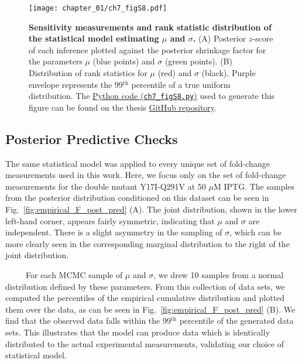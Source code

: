 \documentclass[12pt]{caltech_thesis}
\begin{document}
\hypertarget{fig:empirical_F_sensitivity}{%
\begin{figure}
\centering
\texttt{[image: chapter\_01/ch7\_figS8.pdf]}
\caption[{Sensitivity measurements and rank statistic distribution of
the statistical model estimating \(\mu\) and
\(\sigma\).}]{\textbf{Sensitivity measurements and rank statistic
distribution of the statistical model estimating \(\mu\) and
\(\sigma\).} (A) Posterior \(z\)-score of each inference plotted against
the posterior shrinkage factor for the parameters \(\mu\) (blue points)
and \(\sigma\) (green points). (B) Distribution of rank statistics for
\(\mu\) (red) and \(\sigma\) (black). Purple envelope represents the
99\(^\text{th}\) percentile of a true uniform distribution. The
\href{https://github.com/gchure/phd/blob/master/src/chapter_07/code/ch7_figS8.py}{Python
code (\texttt{ch7\_figS8.py})} used to generate this figure can be found
on the thesis \href{https://github.com/gchure/phd}{GitHub repository}.}
\label{fig:empirical_F_sensitivity}
\end{figure}
}

\hypertarget{posterior-predictive-checks}{%
\subsection{Posterior Predictive
Checks}\label{posterior-predictive-checks}}

The same statistical model was applied to every unique set of
fold-change measurements used in this work. Here, we focus only on the
set of fold-change measurements for the double mutant Y17I-Q291V at 50
\(\mu\)M IPTG. The samples from the posterior distribution conditioned
on this dataset can be seen in Fig.~\ref{fig:empirical_F_post_pred} (A).
The joint distribution, shown in the lower left-hand corner, appears
fairly symmetric, indicating that \(\mu\) and \(\sigma\) are
independent. There is a slight asymmetry in the sampling of \(\sigma\),
which can be more clearly seen in the corresponding marginal
distribution to the right of the joint distribution.

~~~~~For each MCMC sample of \(\mu\) and \(\sigma\), we drew 10 samples
from a normal distribution defined by these parameters. From this
collection of data sets, we computed the percentiles of the empirical
cumulative distribution and plotted them over the data, as can be seen
in Fig.~\ref{fig:empirical_F_post_pred} (B). We find that the observed
data falls within the 99\(^\text{th}\) percentile of the generated data
sets. This illustrates that the model can produce data which is
identically distributed to the actual experimental measurements,
validating our choice of statistical model.
\end{document}
